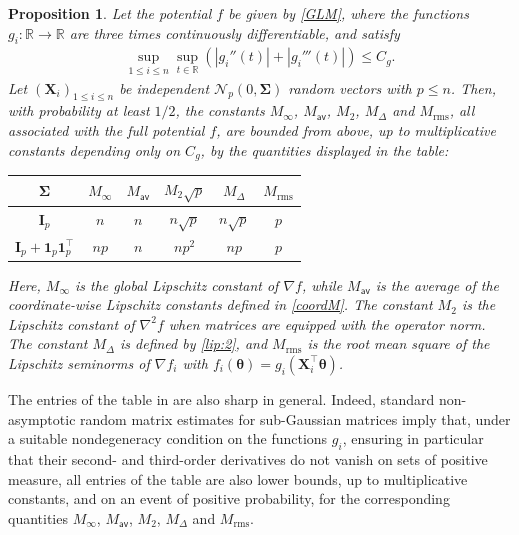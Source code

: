 \documentclass[aos,reqno]{imsart}
\newcommand\bX{\boldsymbol X}
\newcommand\btheta{\boldsymbol\theta}
\newcommand\bSigma{\boldsymbol\Sigma}
\def\Mav{M_{\textsf{av}}}
\def\Mmax{M_{\infty}}
\def\Mtwo{M_{\mathrm{rms}}}
\newtheorem{proposition}{Proposition}
\theoremstyle{definition}
\begin{document}
\begin{proposition}\label{prop:glm-constants}
    Let the potential $f$ be given by \eqref{GLM}, 
    where the functions $g_i:\mathbb R\to\mathbb R$ 
    are three times continuously differentiable, 
    and satisfy
    \begin{align}
        \sup_{1\leqslant i\leqslant n}
        \sup_{t\in\mathbb R}(|g_i''(t)| + |g_i'''
        (t)|)\leqslant  C_g .
    \end{align}
    Let $(\bX_i)_{1\leqslant i\leqslant n}$ be independent
    $\mathcal N_p(0,\bSigma)$ random vectors with
    $p\leqslant n$. Then, with probability at least $1/2$,
    the constants $\Mmax$, $\Mav$, $M_2$, $M_\Delta$ and
    $\Mtwo$, all associated with the full potential $f$,
    are bounded from above, up to multiplicative constants
    depending only on $C_g$, by the quantities displayed
    in the table:
    \begin{center}
    \begin{tabular}{@{}c|cc|cc|c@{}}
        \toprule
        $\bSigma$
        & $\Mmax$
        & $\Mav$
        & $M_2\sqrt{p}$
        & $M_\Delta$
        & $\Mtwo$
        \\
        \midrule
        $\mathbf I_p$
        & $n$
        & $n$
        & $n\sqrt p$
        & $n\sqrt p$
        & $p$
        \\
        $\mathbf I_p+\mathbf 1_p\mathbf 1_p^\top$
        & $np$
        & $n$
        & $np^2$
        & $np$
        & $p$
        \\
        \bottomrule
    \end{tabular}
    \end{center}
    Here, $\Mmax$ is the global Lipschitz constant of
    $\nabla f$, while $\Mav$ is the average of the
    coordinate-wise Lipschitz constants defined in
    \eqref{coordM}. The constant $M_2$ is the Lipschitz
    constant of $\nabla^2 f$ when matrices are equipped
    with the operator norm. The constant $M_\Delta$ is
    defined by \eqref{lip:2}, and $\Mtwo$ is the root mean
    square of the Lipschitz seminorms of $\nabla f_i$ with
    $f_i(\btheta)=g_i(\bX_i^\top\btheta)$.
\end{proposition}

The entries of the table in  are 
also sharp in general. Indeed, standard non-asymptotic random 
matrix estimates for sub-Gaussian matrices
\citep{vershynin2018high} imply that, under a suitable 
nondegeneracy condition on the functions $g_i$, ensuring 
in particular that their second- and third-order derivatives 
do not vanish on sets of positive measure, all entries of 
the table are also lower bounds, up to multiplicative 
constants, and on an event of positive probability, for the 
corresponding quantities $\Mmax$, $\Mav$, $M_2$, $M_\Delta$ 
and $\Mtwo$.
\end{document}
